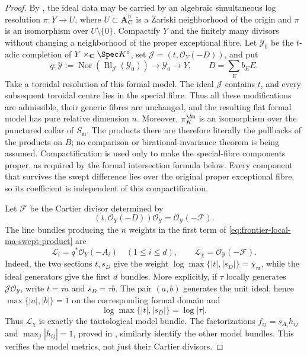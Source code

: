 \begin{proof}
By , the ideal data may be
carried by an algebraic simultaneous log resolution
\(\pi:Y\to U\), where \(U\subset\mathbf A^n_{\mathbf C}\) is a Zariski
neighborhood of the origin and \(\pi\) is an isomorphism over
\(U\setminus\{0\}\).  Compactify \(Y\) and the finitely many divisors without changing a
neighborhood of the proper exceptional fibre.  Let
\(\mathscr Y_0\) be the \(t\)-adic completion of
\(Y\times_{\mathbf C}\Spec K^\circ\), set
\(\mathscr J=(t,\mathcal O_Y(-D))\), and put
\begin{equation}
 q:\mathscr Y:=
 \operatorname{Nor}\!\left(
       \operatorname{Bl}_{\mathscr J}(\mathscr Y_0)\right)
       \longrightarrow\mathscr Y_0\longrightarrow Y,
 \qquad D=\sum_Eb_EE.
 \label{eq:frontier-local-ma-formal-blowup}
\end{equation}
Take a toroidal resolution of this formal model.  The ideal \(\mathscr J\)
contains \(t\), and every subsequent toroidal centre lies in the special
fibre.  Thus all these modifications are admissible, their generic fibres
are unchanged, and the resulting flat formal model has pure relative
dimension \(n\).  Moreover, \(\pi_K^{\An}\) is an isomorphism over the
punctured collar of \(S_{\mathfrak m}\).  The products there are therefore
literally the pullbacks of the products on \(B\); no comparison or
birational-invariance theorem is being assumed.  Compactification is used
only to make the special-fibre components proper, as required by the formal
intersection formula below.  Every component that survives the swept
difference lies over the original proper exceptional fibre, so its
coefficient is independent of this compactification.

Let \(\mathscr F\) be the Cartier divisor determined by
\[
 (t,\mathcal O_Y(-D))\mathcal O_{\mathscr Y}
       =\mathcal O_{\mathscr Y}(-\mathscr F).
\]
The line bundles producing the \(n\) weights in the first term of
\eqref{eq:frontier-local-ma-swept-product} are
\begin{equation}
 \mathcal L_i=q^*\mathcal O_Y(-A_i)\quad(1\leq i\leq d),
 \qquad
 \mathcal L_\chi=\mathcal O_{\mathscr Y}(-\mathscr F).
 \label{eq:frontier-local-ma-model-line-bundles}
\end{equation}
Indeed, the two sections \(t,s_D\) give the weight
\(\log\max\{|t|,|s_D|\}=\chi_{\mathfrak m}\), while the ideal generators
give the first \(d\) bundles.  More explicitly, if \(\tau\) locally
generates \(\mathscr J\mathcal O_{\mathscr Y}\), write
\(t=\tau a\) and \(s_D=\tau b\).  The pair \((a,b)\) generates the unit
ideal, hence \(\max\{|a|,|b|\}=1\) on the corresponding formal domain and
\[
             \log\max\{|t|,|s_D|\}=\log|\tau|.
\]
Thus \(\mathcal L_\chi\) is exactly the tautological model bundle.  The
factorizations \(f_{ij}=s_{A_i}h_{ij}\) and
\(\max_j|h_{ij}|=1\), proved in
, similarly identify the
other model bundles.  This verifies the model metrics, not just their
Cartier divisors.


\end{proof}
